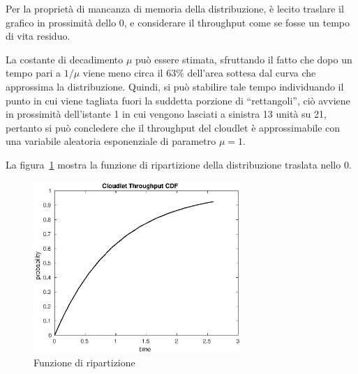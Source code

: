 Per la proprietà di mancanza di memoria della distribuzione, è lecito traslare
il grafico in prossimità dello 0, e considerare il throughput come se fosse un
tempo di vita residuo.

La costante di decadimento $\mu$ può essere stimata, sfruttando il fatto che
dopo un tempo pari a $1/\mu$ viene meno circa il $63\%$ dell'area sottesa dal
curva che approssima la distribuzione. 
Quindi, si può stabilire tale tempo individuando il punto in cui viene
tagliata fuori la suddetta porzione di ``rettangoli'', ciò avviene in prossimità
dell'istante 1 in cui vengono lasciati a sinistra 13 unità su 21, pertanto si
può concledere che il throughput del cloudlet è approssimabile con una variabile
aleatoria esponenziale di parametro $\mu=1$.

La figura~\ref{thrclet_cdf} mostra la funzione di ripartizione della
distribuzione traslata nello 0.
\begin{figure}[!h]
\includegraphics[width=0.7\textwidth]{figures/thrclet_cdf}
\centering
\caption{Funzione di ripartizione}
\label{thrclet_cdf}
\end{figure}
